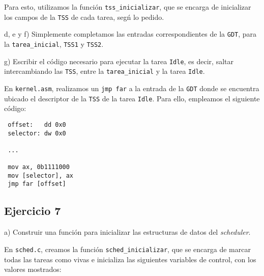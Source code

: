 Para esto, utilizamos la funci\'on \verb|tss_inicializar|, que se encarga de inicializar los campos de la \verb|TSS| 
de cada tarea, seg\'n lo pedido.

\vspace*{0.5cm} \noindent



\noindent
d, e y f) Simplemente completamos las entradas correspondientes de la \verb|GDT|, para la \verb|tarea_inicial|, \verb|TSS1| y
\verb|TSS2|.


\vspace*{0.3cm}



\vspace*{0.5cm} \noindent



\noindent
g) Escribir el c\'odigo necesario para ejecutar la tarea \verb|Idle|, es decir, saltar intercambiando las \verb|TSS|, 
entre la \verb|tarea_inicial| y la tarea \verb|Idle|.
 
\vspace*{0.3cm}

En \verb|kernel.asm|, realizamos un \verb|jmp far| a la entrada de la \verb|GDT| donde se encuentra ubicado el descriptor de 
la \verb|TSS| de la tarea \verb|Idle|. Para ello, empleamos el siguiente c\'odigo: 

\begin{verbatim}
 offset:   dd 0x0
 selector: dw 0x0

 ...

 mov ax, 0b1111000
 mov [selector], ax
 jmp far [offset]
\end{verbatim}


\vspace*{0.5cm} \noindent




\newpage





\subsection*{Ejercicio 7}

\vspace*{0.5cm}

\noindent
a) Construir una funci\'on para inicializar las estructuras de datos del \textit{scheduler}.

\vspace*{0.3cm}

En \verb|sched.c|, creamos la funci\'on \verb|sched_inicializar|, que se encarga de marcar todas las tareas como vivas e inicializa 
las siguientes variables de control, con los valores mostrados: 

